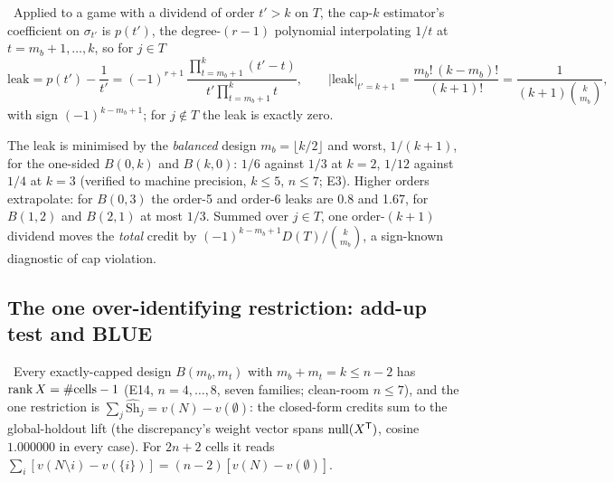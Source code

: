 \begin{law}
\label{attr:law:alias}
\tagEstablished\ Applied to a game with a dividend of order $t' > k$ on $T$, the cap-$k$ estimator's coefficient on $\sigma_{t'}$ is $p(t')$, the degree-$(r-1)$ polynomial interpolating $1/t$ at $t = m_b + 1, \ldots, k$, so for $j \in T$
\begin{equation}
\text{leak} = p(t') - \frac1{t'} = (-1)^{r+1}\,\frac{\prod_{t = m_b+1}^{k}(t' - t)}{t' \prod_{t = m_b+1}^{k} t}, \qquad |\text{leak}|_{t' = k+1} = \frac{m_b!\,(k - m_b)!}{(k+1)!} = \frac{1}{(k+1)\binom{k}{m_b}},
\label{eq:attr:leak}
\end{equation}
with sign $(-1)^{k - m_b + 1}$; for $j \notin T$ the leak is exactly zero.
\end{law}

The leak is minimised by the \emph{balanced} design $m_b = \lfloor k/2 \rfloor$ and worst, $1/(k+1)$, for the one-sided $B(0,k)$ and $B(k,0)$: $1/6$ against $1/3$ at $k = 2$, $1/12$ against $1/4$ at $k = 3$ (verified to machine precision, $k \le 5$, $n \le 7$; E3). Higher orders extrapolate: for $B(0,3)$ the order-5 and order-6 leaks are 0.8 and 1.67, for $B(1,2)$ and $B(2,1)$ at most $1/3$. Summed over $j \in T$, one order-$(k+1)$ dividend moves the \emph{total} credit by $(-1)^{k - m_b + 1} D(T)/\binom{k}{m_b}$, a sign-known diagnostic of cap violation.

\subsection{The one over-identifying restriction: add-up test and BLUE}

\begin{proposition}
\label{attr:prop:addup}
\tagNumerical\ Every exactly-capped design $B(m_b, m_t)$ with $m_b + m_t = k \le n - 2$ has $\operatorname{rank} X = \#\text{cells} - 1$ (E14, $n = 4, \ldots, 8$, seven families; clean-room $n \le 7$), and the one restriction is $\sum_j \hat{\mathrm{Sh}}_j = v(N) - v(\emptyset)$: the closed-form credits sum to the global-holdout lift (the discrepancy's weight vector spans $\mathrm{null}(X^{\mathsf{T}})$, cosine $1.000000$ in every case). For $2n + 2$ cells it reads $\sum_i[v(N \setminus i) - v(\{i\})] = (n-2)[v(N) - v(\emptyset)]$.
\end{proposition}

